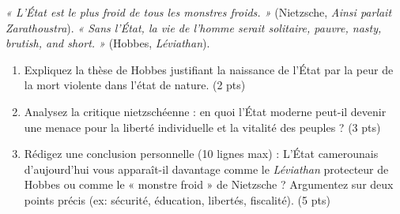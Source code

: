 \documentclass[11pt]{article}
\begin{document}
\begin{exercice}
\emph{« L'État est le plus froid de tous les monstres froids. »} (Nietzsche, \textit{Ainsi parlait Zarathoustra}). \emph{« Sans l'État, la vie de l'homme serait solitaire, pauvre, nasty, brutish, and short. »} (Hobbes, \textit{Léviathan}).
\begin{enumerate}
    \item Expliquez la thèse de Hobbes justifiant la naissance de l'État par la peur de la mort violente dans l'état de nature. (2 pts)
    \item Analysez la critique nietzschéenne : en quoi l'État moderne peut-il devenir une menace pour la liberté individuelle et la vitalité des peuples ? (3 pts)
    \item Rédigez une conclusion personnelle (10 lignes max) : L'État camerounais d'aujourd'hui vous apparaît-il davantage comme le \textit{Léviathan} protecteur de Hobbes ou comme le « monstre froid » de Nietzsche ? Argumentez sur deux points précis (ex: sécurité, éducation, libertés, fiscalité). (5 pts)
\end{enumerate}
\end{exercice}
\end{document}
